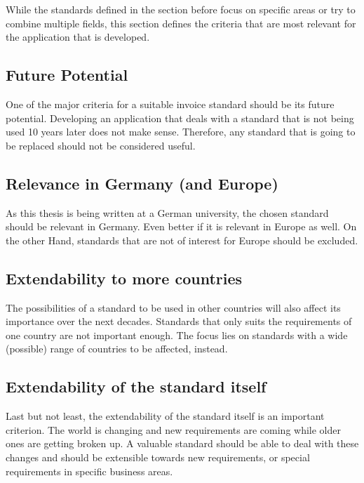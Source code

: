 While the standards defined in the section before focus on specific areas or try to combine multiple fields, this section defines the criteria that are most relevant for the application that is developed.

\subsection{Future Potential}
\label{sec2.2.1}
One of the major criteria for a suitable invoice standard should be its future potential. Developing an application that deals with a standard that is not being used 10 years later does not make sense. Therefore, any standard that is going to be replaced should not be considered useful.

\subsection{Relevance in Germany (and Europe)}
\label{sec2.2.2}
As this thesis is being written at a German university, the chosen standard should be relevant in Germany. Even better if it is relevant in Europe as well. On the other Hand, standards that are not of interest for Europe should be excluded.

\subsection{Extendability to more countries}
\label{sec2.2.3}
The possibilities of a standard to be used in other countries will also affect its importance over the next decades. Standards that only suits the requirements of one country are not important enough. The focus lies on standards with a wide (possible) range of countries to be affected, instead.

\subsection{Extendability of the standard itself}
\label{sec2.2.4}
Last but not least, the extendability of the standard itself is an important criterion. The world is changing and new requirements are coming while older ones are getting broken up. A valuable standard should be able to deal with these changes and should be extensible towards new requirements, or special requirements in specific business areas.

